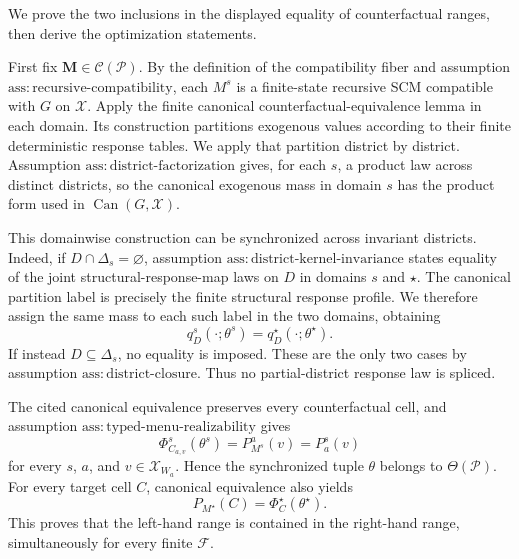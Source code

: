 We prove the two inclusions in the displayed equality of counterfactual ranges, then derive the optimization statements.

First fix \(\mathbf M\in\mathcal C(\mathcal P)\).  By the definition of the compatibility fiber and assumption \(\mathrm{ass:recursive\text{-}compatibility}\), each \(M^s\) is a finite-state recursive SCM compatible with \(G\) on \(\mathcal X\).  Apply the finite canonical counterfactual-equivalence lemma in each domain.  Its construction partitions exogenous values according to their finite deterministic response tables.  We apply that partition district by district.  Assumption \(\mathrm{ass:district\text{-}factorization}\) gives, for each \(s\), a product law across distinct districts, so the canonical exogenous mass in domain \(s\) has the product form used in \(\operatorname{Can}(G,\mathcal X)\).

This domainwise construction can be synchronized across invariant districts.  Indeed, if \(D\cap\Delta_s=\varnothing\), assumption \(\mathrm{ass:district\text{-}kernel\text{-}invariance}\) states equality of the joint structural-response-map laws on \(D\) in domains \(s\) and \(\star\).  The canonical partition label is precisely the finite structural response profile.  We therefore assign the same mass to each such label in the two domains, obtaining
\[
 q_D^s(\cdot;\theta^s)=q_D^\star(\cdot;\theta^\star).
\]
If instead \(D\subseteq\Delta_s\), no equality is imposed.  These are the only two cases by assumption \(\mathrm{ass:district\text{-}closure}\).  Thus no partial-district response law is spliced.

The cited canonical equivalence preserves every counterfactual cell, and assumption \(\mathrm{ass:typed\text{-}menu\text{-}realizability}\) gives
\[
 \Phi_{C_{a,v}}^s(\theta^s)
 =P_{M^s}^{a}(v)=P_a^s(v)
\]
for every \(s\), \(a\), and \(v\in\mathcal X_{W_a}\).  Hence the synchronized tuple \(\theta\) belongs to \(\Theta(\mathcal P)\).  For every target cell \(C\), canonical equivalence also yields
\[
 P_{M^\star}(C)=\Phi_C^\star(\theta^\star).
\]
This proves that the left-hand range is contained in the right-hand range, simultaneously for every finite \(\mathcal F\).

